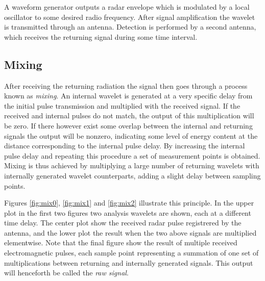 

A waveform generator outputs a radar envelope which is modulated by a local oscillator to some desired radio frequency. After signal amplification the wavelet is transmitted through an antenna. Detection is performed by a second antenna, which receives the returning signal during some time interval. 

\subsection{Mixing}

After receiving the returning radiation the signal then goes through a process known as \emph{mixing}. An internal wavelet is generated at a very specific delay from the initial pulse transmission and multiplied with the received signal. If the received and internal pulses do not match, the output of this multiplication will be zero. If there however exist some overlap between the internal and returning signals the output will be nonzero, indicating some level of energy content at the distance corresponding to the internal pulse delay. By increasing the internal pulse delay and repeating this procedure a set of measurement points is obtained. Mixing is thus achieved by multiplying a large number of returning wavelets with internally generated wavelet counterparts, adding a slight delay between sampling points. 


Figures \ref{fig:mix0}, \ref{fig:mix1} and \ref{fig:mix2} illustrate this principle. In the upper plot in the first two figures two analysis wavelets are shown, each at a different time delay. The center plot show the received radar pulse registrered by the antenna, and the lower plot the result when the two above signals are multiplied elementwise. Note that the final figure show the result of multiple received electromagnetic pulses, each sample point representing a summation of one set of multiplications between returning and internally generated signals. This output will henceforth be called the \emph{raw signal}.   


